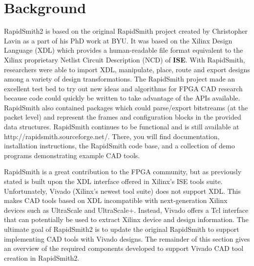 \newpage
\section{Background}

\graphicspath{{./techReportFigures/sec2_background/}}

RapidSmith2 is based on the original RapidSmith project created by Christopher
Lavin as a part of his PhD work at BYU.  It was based on the Xilinx Design
Language (XDL) which provides a human-readable file format equivalent to the
Xilinx proprietary Netlist Circuit Description (NCD) of \textbf{ISE}.  With
RapidSmith, researchers were able to import XDL, manipulate, place, route and export
designs among a variety of design transformations.  The RapidSmith project made
an excellent test bed to try out new ideas and algorithms for FPGA CAD research
because code could quickly be written to take advantage of the APIs available.
RapidSmith also contained packages which could parse/export bitstreams (at the
packet level) and represent the frames and configuration blocks in the provided
data structures. RapidSmith continues to be functional and is still available at
{\color{blue} http://rapidsmith.sourceforge.net/}. There, you will find
documentation, installation instructions, the RapidSmith code base, and a
collection of demo programs demonstrating example CAD tools.

RapidSmith is a great contribution to the FPGA community, but as previously
stated is built upon the XDL interface offered in Xilinx's ISE tools suite.
Unfortunately, Vivado (Xilinx's newest tool suite) does not support XDL. This
makes CAD tools based on XDL incompatible with next-generation Xilinx devices
such as UltraScale and UltraScale+. Instead, Vivado offers a Tcl interface
that can potentially be used to extract Xilinx device and design information.
The ultimate goal of RapidSmith2 is to update the original RapidSmith to support
implementing CAD tools with Vivado designs. The remainder of this section gives
an overview of the required components developed to support Vivado CAD tool
creation in RapidSmith2.

